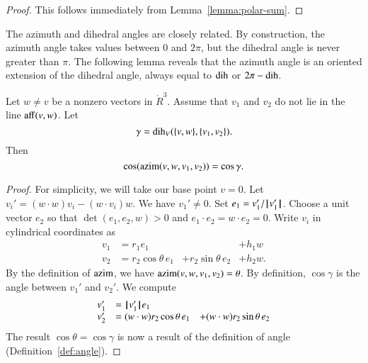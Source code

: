 \begin{proof} This follows immediately from 
Lemma~\ref{lemma:polar-sum}.
\end{proof}


The azimuth and dihedral angles are closely related.   By construction,
the azimuth angle takes values between $0$ and $2\pi$, but the dihedral
angle is never greater than $\pi$.  The following lemma reveals that
the azimuth angle is an oriented extension of the dihedral angle, always
equal to $\operatorname{dih}$ or $2\pi - \operatorname{dih}$.


\begin{lemma}\label{lemma:dih-azim}
Let $w\ne v$ be a nonzero vectors in $\ring{R}^3$.
  Assume that $v_1$ and $v_2$ do not lie in the line ${\operatorname{aff}}(v,w)$.
Let
  $$\gamma = \operatorname{dih}_V(\{v,w\},\{v_1,v_2\}).$$
  Then
    $$
    \cos({\operatorname{azim}}(v,w,v_1,v_2)) = \cos\gamma.
    $$
\end{lemma}

\begin{proof}  For simplicity,
we will take our base point $v=0$.
Let $v_i' = (w\cdot w) v_i - (w\cdot v_i) w$.  
We have $v_1'\ne 0$.  Set $e_1 = v_1'/{{\hskip0.1em|\hskip-0.15em|\hskip0.1em}v'_1{\hskip0.1em|\hskip-0.15em|\hskip0.1em}}$.  Choose a unit vector
$e_2$ so that $\det(e_1,e_2,w)>0$ and $e_1\cdot e_2 = w\cdot e_2=0$.
Write $v_i$ in cylindrical coordinates as 
   $$
   \begin{array}{lllll}
     v_1 &= r_1 e_1 &    &+h_1 w\\
     v_2 &= r_2 \cos\theta\, e_1 &+ r_2 \sin\theta\, e_2 &+ h_2 w.
    \end{array}
   $$
By the definition of ${\operatorname{azim}}$, we have ${\operatorname{azim}}(v,w,v_1,v_2)=\theta$.  
By definition, $\cos\gamma$ is the angle between $v_1'$ and $v_2'$.
We compute
   $$
   \begin{array}{lll}
     v_1' &= {{\hskip0.1em|\hskip-0.15em|\hskip0.1em}v'_1{\hskip0.1em|\hskip-0.15em|\hskip0.1em}} e_1 \\
     v_2' &= (w\cdot w) r_2 \cos\theta\, e_1 
       &+ (w\cdot w) r_2 \sin\theta\, e_2 \\
     \end{array}
   $$
The result $\cos\theta=\cos\gamma$ 
is now a result of the definition of angle 
(Definition~\ref{def:angle}).
\end{proof}





